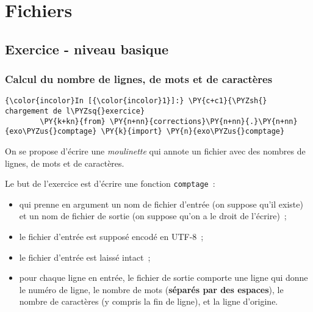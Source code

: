    
    
    
    

    

    \hypertarget{fichiers}{%
\section{Fichiers}\label{fichiers}}

    \hypertarget{exercice---niveau-basique}{%
\subsection{Exercice - niveau basique}\label{exercice---niveau-basique}}

    \hypertarget{calcul-du-nombre-de-lignes-de-mots-et-de-caractuxe8res}{%
\subsubsection{Calcul du nombre de lignes, de mots et de
caractères}\label{calcul-du-nombre-de-lignes-de-mots-et-de-caractuxe8res}}

    \begin{Verbatim}[commandchars=\\\{\},frame=single,framerule=0.3mm,rulecolor=\color{cellframecolor}]
{\color{incolor}In [{\color{incolor}1}]:} \PY{c+c1}{\PYZsh{} chargement de l\PYZsq{}exercice}
        \PY{k+kn}{from} \PY{n+nn}{corrections}\PY{n+nn}{.}\PY{n+nn}{exo\PYZus{}comptage} \PY{k}{import} \PY{n}{exo\PYZus{}comptage}
\end{Verbatim}


    On se propose d'écrire une \emph{moulinette} qui annote un fichier avec
des nombres de lignes, de mots et de caractères.

Le but de l'exercice est d'écrire une fonction \texttt{comptage}~:

\begin{itemize}
\tightlist
\item
  qui prenne en argument un nom de fichier d'entrée (on suppose qu'il
  existe) et un nom de fichier de sortie (on suppose qu'on a le droit de
  l'écrire)~;
\item
  le fichier d'entrée est supposé encodé en UTF-8~;
\item
  le fichier d'entrée est laissé intact~;
\item
  pour chaque ligne en entrée, le fichier de sortie comporte une ligne
  qui donne le numéro de ligne, le nombre de mots (\textbf{séparés par
  des espaces}), le nombre de caractères (y compris la fin de ligne), et
  la ligne d'origine.
\end{itemize}

